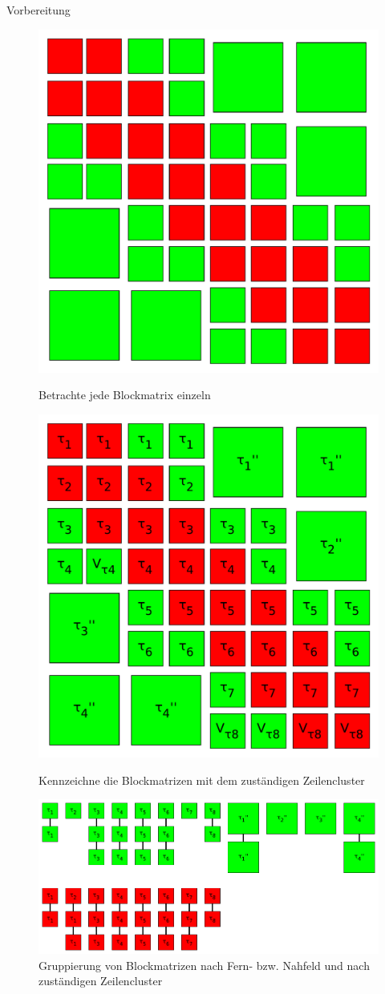\documentclass[10pt]{beamer}
\begin{document}
\begin{frame}{Vorbereitung}\vfill
  \begin{figure}
    \begin{overprint}
        \centering
        \includegraphics[width=.66\linewidth]{figures/fg-h2-matrix-block.pdf}
        \caption{Betrachte jede Blockmatrix einzeln}
        \centering
        \includegraphics[width=.66\linewidth]{figures/fg-h2-matrix-block-labled.pdf}
        \caption{Kennzeichne die Blockmatrizen mit dem zuständigen Zeilencluster}
        \centering
        \includegraphics[width=\linewidth]{figures/fg-h2-matrix-block-orderd.pdf}
        \caption{Gruppierung von Blockmatrizen nach Fern- bzw. Nahfeld und nach
                 zuständigen Zeilencluster}
    \end{overprint}
  \end{figure}
\end{frame}
\end{document}
